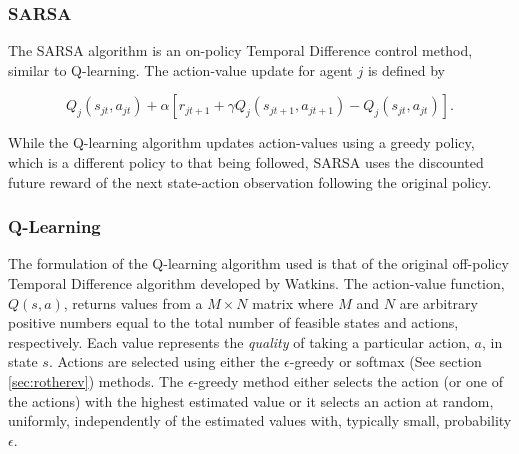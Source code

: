 \subsubsection{SARSA}
\label{sec:sarsa}
%
%
The SARSA algorithm is an on-policy Temporal Difference control method, similar
to Q-learning.  The action-value update for agent $j$ is defined by

\begin{equation}
Q_j(s_{jt},a_{jt}) + \alpha [r_{jt+1} + \gamma Q_j(s_{jt+1},a_{jt+1}) -
Q_j(s_{jt},a_{jt})] \text{.}
\end{equation}

While the Q-learning algorithm updates action-values using a greedy policy,
which is a different policy to that being followed, SARSA uses the discounted
future reward of the next state-action observation following the original
policy.

\subsubsection{Q-Learning}
\label{sec:qlearning}
The formulation of the Q-learning algorithm used is that of the original
off-policy Temporal Difference algorithm developed by
Watkins\cite{watkins:1989}.  The action-value function, $Q(s,a)$, returns
values from a $M \times N$ matrix where $M$ and $N$ are arbitrary positive
numbers equal to the total number of feasible states and actions, respectively.
Each value represents the \textit{quality} of taking a particular action, $a$,
in state $s$.  Actions are selected using either the $\epsilon$-greedy or
softmax (See section \ref{sec:rotherev}) methods.  The $\epsilon$-greedy method
either selects the action (or one of the actions) with the highest estimated
value or it selects an action at random, uniformly, independently of the
estimated values with, typically small, probability $\epsilon$.

